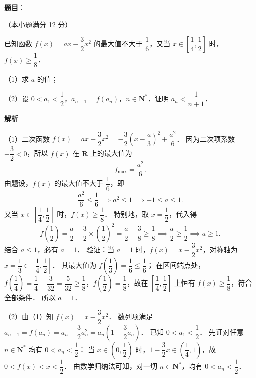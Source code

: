 \begin{answer}

\textbf{题目}：

（本小题满分 12 分）

已知函数 $f(x) = ax - \dfrac{3}{2}x^2$ 的最大值不大于 $\dfrac{1}{6}$，又当 $x \in \left[\dfrac{1}{4}, \dfrac{1}{2}\right]$ 时，$f(x) \geqslant \dfrac{1}{8}$．

（1）求 $a$ 的值；

（2）设 $0 < a_1 < \dfrac{1}{2}$，$a_{n+1} = f(a_n)$，$n \in \mathbf{N}^*$．证明 $a_n < \dfrac{1}{n+1}$．

\textbf{解析}

（1）二次函数 $f(x) = ax - \dfrac{3}{2}x^2 = -\dfrac{3}{2}\left(x - \dfrac{a}{3}\right)^2 + \dfrac{a^2}{6}$．
因为二次项系数 $-\dfrac{3}{2} < 0$，所以 $f(x)$ 在 $\mathbf{R}$ 上的最大值为
\nopagebreak[4]
\[
f_{\max} = \frac{a^2}{6}.
\]
由题设，$f(x)$ 的最大值不大于 $\dfrac{1}{6}$，即
\nopagebreak[4]
\[
\frac{a^2}{6} \leqslant \frac{1}{6} \implies a^2 \leqslant 1 \implies -1 \leqslant a \leqslant 1.
\]
又当 $x \in \left[\dfrac{1}{4}, \dfrac{1}{2}\right]$ 时，$f(x) \geqslant \dfrac{1}{8}$．
特别地，取 $x = \dfrac{1}{2}$，代入得
\nopagebreak[4]
\[
f\left(\frac{1}{2}\right) = \frac{a}{2} - \frac{3}{2} \times \left(\frac{1}{2}\right)^2 = \frac{a}{2} - \frac{3}{8} \geqslant \frac{1}{8} \implies \frac{a}{2} \geqslant \frac{1}{2} \implies a \geqslant 1.
\]
结合 $a \leqslant 1$，必有 $a = 1$．
验证：当 $a = 1$ 时，$f(x) = x - \dfrac{3}{2}x^2$，对称轴为 $x = \dfrac{1}{3} \in \left[\dfrac{1}{4}, \dfrac{1}{2}\right]$．
其最大值为 $f\left(\dfrac{1}{3}\right) = \dfrac{1}{6} \leqslant \dfrac{1}{6}$；
在区间端点处，$f\left(\dfrac{1}{4}\right) = \dfrac{1}{4} - \dfrac{3}{32} = \dfrac{5}{32} \geqslant \dfrac{1}{8}$，$f\left(\dfrac{1}{2}\right) = \dfrac{1}{8}$，故在 $\left[\dfrac{1}{4}, \dfrac{1}{2}\right]$ 上恒有 $f(x) \geqslant \dfrac{1}{8}$，符合全部条件．
所以 $a = 1$．

（2）由（1）知 $f(x) = x - \dfrac{3}{2}x^2$．
数列项满足 $a_{n+1} = f(a_n) = a_n - \dfrac{3}{2}a_n^2 = a_n\left(1 - \dfrac{3}{2}a_n\right)$．
已知 $0 < a_1 < \dfrac{1}{2}$．
先证对任意 $n \in \mathbf{N}^*$ 均有 $0 < a_n < \dfrac{1}{2}$：
当 $x \in \left(0, \dfrac{1}{2}\right)$ 时，$1 - \dfrac{3}{2}x \in \left(\dfrac{1}{4}, 1\right)$，故 $0 < f(x) < x < \dfrac{1}{2}$．
由数学归纳法可知，对一切 $n \in \mathbf{N}^*$，均有 $0 < a_n < \dfrac{1}{2}$．


\end{answer}
